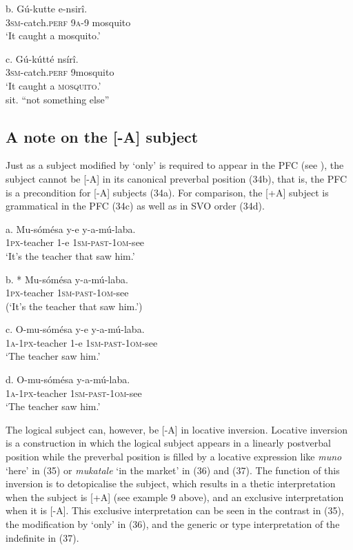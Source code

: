 \documentclass[output=paper]{langsci/langscibook}
\begin{document}
\ea
\gll   b.  Gú-kutte    e-nsirî.\\
         \textsc{3sm}-catch.\textsc{perf}  \textsc{9a}-9 mosquito\\
\glt     ‘It caught a mosquito.’
\z

\ea
\gll   c.  Gú-kútté    nsírî.\\
         \textsc{3sm}-catch.\textsc{perf}  9mosquito\\
\glt ‘It caught a \textsc{mosquito}.’\\
sit. “not something else”
\z

\subsection{A note on the [-A] subject} %

Just as a subject modified by ‘only’ is required to appear in the PFC (see ), the subject cannot be [-A] in its canonical preverbal position (34b), that is, the PFC is a precondition for [-A] subjects (34a). For comparison, the [+A] subject is grammatical in the PFC (34c) as well as in SVO order (34d).

\ea
\gll   a.  Mu-sómésa  y-e  y-a-mú-laba.\\
         \textsc{1px}-teacher  1-e  \textsc{1sm}-\textsc{past}-\textsc{1om}-see\\
\glt     ‘It’s the teacher that saw him.’
\z

\ea
\gll   b.  * Mu-sómésa  y-a-mú-laba.\\
         \textsc{1px}-teacher  \textsc{1sm}-\textsc{past}-\textsc{1om}-see\\
\glt     (‘It’s the teacher that saw him.’)
\z

\ea
\gll   c.  O-mu-sómésa  y-e  y-a-mú-laba.\\
         \textsc{1a}-\textsc{1px}-teacher  1-e  \textsc{1sm}-\textsc{past}-\textsc{1om}-see\\
\glt     ‘The teacher saw him.’
\z

\ea
\gll   d.  O-mu-sómésa  y-a-mú-laba.\\
         \textsc{1a}-\textsc{1px}-teacher  \textsc{1sm}-\textsc{past}-\textsc{1om}-see\\
\glt     ‘The teacher saw him.’
\z

The logical subject can, however, be [-A] in locative inversion. Locative inversion is a construction in which the logical subject appears in a linearly postverbal position while the preverbal position is filled by a locative expression like \textit{muno} ‘here’ in (35) or \textit{mukatale} ‘in the market’ in (36) and (37). The function of this inversion is to detopicalise the subject, which results in a thetic interpretation when the subject is [+A] (see example 9 above), and an exclusive interpretation when it is [-A]. This exclusive interpretation can be seen in the contrast in (35), the modification by ‘only’ in (36), and the generic or type interpretation of the indefinite in (37).
\end{document}
